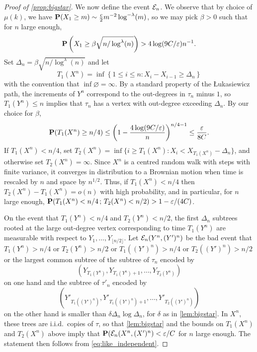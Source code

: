 \documentclass[11pt,reqno]{amsart}
\newcommand{\eps}{\varepsilon}
\renewcommand{\emptyset}{\varnothing}
\begin{document}
\begin{proof}[Proof of \cref{prop:bigstar}]
We now define the event $\cE_n$. We observe that by choice of $\mu(k)$, we have $\P(X_1\ge m)\sim \tfrac{c}{2}m^{-2}\log^{-\lambda}(m)$, so we may pick $\beta>0$ such that for $n$ large enough, \[\P\left( X_1\ge \beta \sqrt{n/\log^\lambda(n)} \right)>4\log(9C/\eps)n^{-1}.\] Set $\Delta_n=\beta \sqrt{n/\log^\lambda(n)}$ and let \[T_1(X^n)=\inf\left\{1\le i \le n: X_{i}-X_{i-1}\ge \Delta_n\right\} \] 
with the convention that $\inf\emptyset = \infty$. By a standard property of the \L ukasiewicz path, the increments of $Y^n$ correspond to the out-degrees in $\tau_n$ minus $1$, so $T_1(Y^n)\le n$ implies that $\tau_n$ has a vertex with out-degree exceeding $\Delta_n$. 
By our choice for $\beta$, \[\P(T_1(X^n)\geq n/4) \le \left(1-\frac{4\log(9C/\eps)}{n}\right)^{n/4-1}\le \frac{\eps}{8C}.\] If $T_1(X^n)< n/4$, set $T_2(X^n)=\inf\{i\geq T_1(X^n): X_i<X_{T_1(X^n)}-\Delta_n\}$, and otherwise set $T_2(X^n)=\infty$. Since $X^n$ is a centred random walk with steps with finite variance, it converges in distribution to a Brownian motion when time is rescaled by $n$ and space by $n^{1/2}$. Thus, if $T_1(X^n)<n/4$ then $T_2(X^n)-T_1(X^n)=o(n)$ with high probability, and in particular, for $n$ large enough, $\P(T_1(X^n)<n/4 \,;\, T_2(X^n)<n/2)>1-\eps/(4C)$. 

On the event that $T_1(Y^n)<n/4$ and $T_2(Y^n)<n/2$, the first $\Delta_n$ subtrees rooted at the large out-degree vertex corresponding to time $T_1(Y^n)$ are measurable with respect to $Y_1,\dots, Y_{\lfloor n/2\rfloor}$.  Let $\cE_n(Y^n,(Y')^n)$ be the bad event that $T_1(Y^n)>n/4$ or $T_2(Y^n)>n/2$ or $T_1((Y')^n)>n/4$ or $T_2((Y')^n)>n/2$ or the largest common subtree of the subtree of $\tau_n$ encoded by \[(Y_{T_1(Y^n)},Y_{{T_1(Y^n)}+1}, \dots, Y_{T_2(Y^n)})\] on one hand and the subtree of $\tau'_n$ encoded by \[(Y'_{T_1((Y')^n)},Y'_{{T_1((Y')^n)}+1}, \dots, Y'_{T_2((Y')^n)})\] on the other hand is smaller than $\delta \Delta_n\log \Delta_n$, for $\delta$ as in \cref{lem:bigstar}. In $X^n$, these trees are i.i.d.~copies of $\tau$, so that \cref{lem:bigstar} and the bounds on $T_1(X^n)$ and $T_2(X^n)$ above imply that $\P(\cE_n(X^n,(X')^n)<\eps/C$ for $n$ large enough. The statement then follows from \eqref{eq:like_independent}.
\end{proof}





\end{document}

